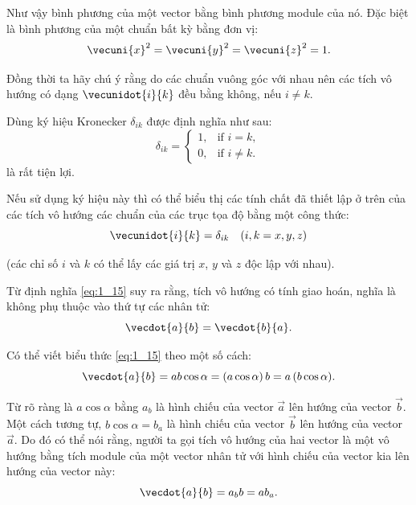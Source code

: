 \noindent
Như vậy bình phương của một vector bằng bình phương module của nó. Đặc biệt là bình phương của một chuẩn bất kỳ bằng đơn vị:
\begin{equation}\label{eq:1_17}
\vecuni{x}^2 = \vecuni{y}^2 = \vecuni{z}^2 = 1.
\end{equation}

\noindent
Đồng thời ta hãy chú ý rằng do các chuẩn vuông góc với nhau nên các tích vô hướng có dạng $\vecunidot{i}{k}$ đều bằng không, nếu $i\neq k$.

Dùng ký hiệu Kronecker $\delta_{ik}$ được định nghĩa như sau:
\begin{equation}\label{eq:1_18}
\delta_{ik} = \begin{cases}
1, &\mbox{if } i = k, \\
0, &\mbox{if } i\neq k. \end{cases}
\end{equation}
là rất tiện lợi.

\noindent
Nếu sử dụng ký hiệu này thì có thể biểu thị các tính chất đã thiết lập ở trên của các tích vô hướng các chuẩn của các trục tọa độ bằng một công thức:
\begin{equation}\label{eq:1_19}
\vecunidot{i}{k} = \delta_{ik}\quad (i, k = x, y, z)
\end{equation}

\noindent
(các chỉ số $i$ và $k$ có thể lấy các giá trị $x$, $y$ và $z$ độc lập với nhau).

Từ định nghĩa \eqref{eq:1_15} suy ra rằng, tích vô hướng có tính giao hoán, nghĩa là không phụ thuộc vào thứ tự các nhân tử:
\vspace{-12pt}
\begin{equation}\label{eq:1_20}
\vecdot{a}{b} = \vecdot{b}{a}.
\end{equation}

\noindent
Có thể viết biểu thức \eqref{eq:1_15} theo một số cách:
\begin{equation*}
\vecdot{a}{b} = ab\cos\alpha = (a\cos\alpha)\,b = a\,(b\cos\alpha).
\end{equation*}

\noindent
Từ  rõ ràng là $a\cos\alpha$ bằng $a_b$ là hình chiếu của vector $\vec{a}$ lên hướng của vector $\vec{b}$. Một cách tương tự, $b\cos\alpha= b_a$ là hình chiếu của vector $\vec{b}$ lên hướng của vector $\vec{a}$. Do đó có thể nói rằng, người ta gọi tích vô hướng của hai vector là một vô hướng bằng tích module của một vector nhân tử với hình chiếu của vector kia lên hướng của vector này:
\begin{equation}\label{eq:1_21}
\vecdot{a}{b} = a_b b = a b_a.
\end{equation}

